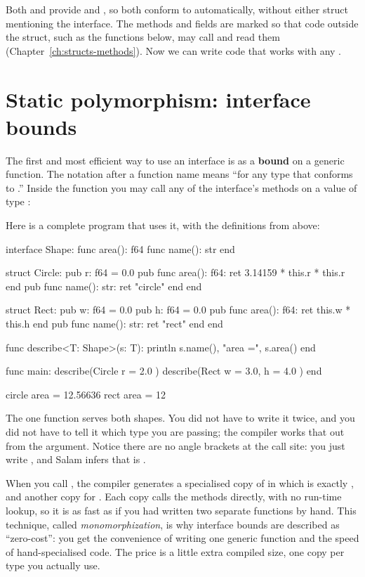 Both  and  provide  and , so
both conform to  automatically, without either struct mentioning
the interface. The methods and fields are marked  so that code outside
the struct, such as the functions below, may call and read them (Chapter~\ref{ch:structs-methods}).
Now we can write code that works with any .

\section{Static polymorphism: interface bounds}

The first and most efficient way to use an interface is as a \textbf{bound} on a
generic function. The notation  after a function name means ``for
any type  that conforms to .'' Inside the function you may
call any of the interface's methods on a value of type :

Here is a complete program that uses it, with the definitions from above:

\begin{salamen}
interface Shape:
    func area(): f64
    func name(): str
end

struct Circle:
    pub r: f64 = 0.0
    pub func area(): f64: ret 3.14159 * this.r * this.r end
    pub func name(): str: ret "circle" end
end

struct Rect:
    pub w: f64 = 0.0
    pub h: f64 = 0.0
    pub func area(): f64: ret this.w * this.h end
    pub func name(): str: ret "rect" end
end

func describe<T: Shape>(s: T):
    println s.name(), "area =", s.area()
end

func main:
    describe(Circle { r = 2.0 })
    describe(Rect { w = 3.0, h = 4.0 })
end
\end{salamen}

\begin{progout}
circle area = 12.56636
rect area = 12
\end{progout}

The one  function serves both shapes. You did not have to write it
twice, and you did not have to tell it which type you are passing; the compiler
works that out from the argument. Notice there are no angle brackets at the call
site: you just write , and Salam infers that
 is .

\begin{deep}
When you call , the compiler generates a
specialised copy of  in which  is exactly ,
and another copy for . Each copy calls the methods directly, with no
run-time lookup, so it is as fast as if you had written two separate functions by
hand. This technique, called \emph{monomorphization}, is why interface bounds are
described as ``zero-cost'': you get the convenience of writing one generic
function and the speed of hand-specialised code. The price is a little extra
compiled size, one copy per type you actually use.
\end{deep}

